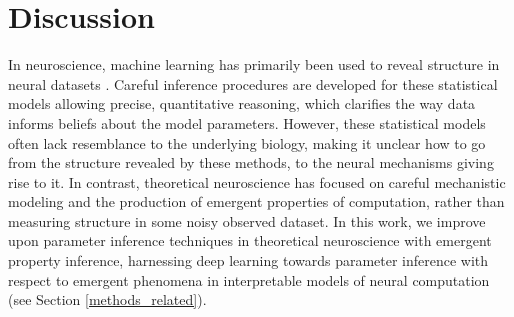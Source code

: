 \documentclass[11pt]{article}
\begin{document}
%

\section{Discussion} 
In neuroscience, machine learning has primarily been used to reveal structure in neural datasets \cite{paninski2018neural}.
Careful inference procedures are developed for these statistical models allowing precise, quantitative reasoning, which clarifies the way data informs beliefs about the model parameters.  
However, these statistical models often lack resemblance to the underlying biology, making it unclear how to go from the structure revealed by these methods, to the neural mechanisms giving rise to it. 
In contrast, theoretical neuroscience has focused on careful mechanistic modeling and the production of emergent properties of computation, rather than measuring structure in some noisy observed dataset.
In this work, we improve upon parameter inference techniques in theoretical neuroscience with emergent property inference, harnessing deep learning towards parameter inference with respect to emergent phenomena in  interpretable models of neural computation (see Section \ref{methods_related}).
\end{document}
